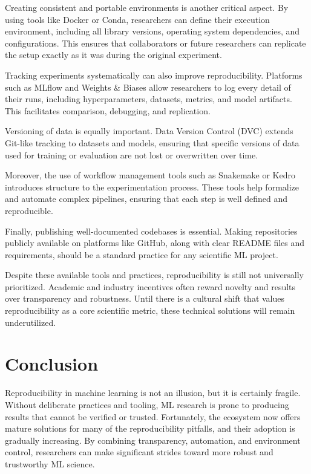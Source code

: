 \documentclass[11pt]{article}
\begin{document}
Creating consistent and portable environments is another critical aspect. By using tools like Docker or Conda, researchers can define their execution environment, including all library versions, operating system dependencies, and configurations. This ensures that collaborators or future researchers can replicate the setup exactly as it was during the original experiment.

Tracking experiments systematically can also improve reproducibility. Platforms such as MLflow and Weights \& Biases allow researchers to log every detail of their runs, including hyperparameters, datasets, metrics, and model artifacts. This facilitates comparison, debugging, and replication.

Versioning of data is equally important. Data Version Control (DVC) extends Git-like tracking to datasets and models, ensuring that specific versions of data used for training or evaluation are not lost or overwritten over time.

Moreover, the use of workflow management tools such as Snakemake or Kedro introduces structure to the experimentation process. These tools help formalize and automate complex pipelines, ensuring that each step is well defined and reproducible.

Finally, publishing well-documented codebases is essential. Making repositories publicly available on platforms like GitHub, along with clear README files and requirements, should be a standard practice for any scientific ML project.

Despite these available tools and practices, reproducibility is still not universally prioritized. Academic and industry incentives often reward novelty and results over transparency and robustness. Until there is a cultural shift that values reproducibility as a core scientific metric, these technical solutions will remain underutilized.


\section{Conclusion}
\label{sec:conclusion}
Reproducibility in machine learning is not an illusion, but it is certainly fragile. Without deliberate practices and tooling, ML research is prone to producing results that cannot be verified or trusted. Fortunately, the ecosystem now offers mature solutions for many of the reproducibility pitfalls, and their adoption is gradually increasing. By combining transparency, automation, and environment control, researchers can make significant strides toward more robust and trustworthy ML science.

% 

\end{document}
